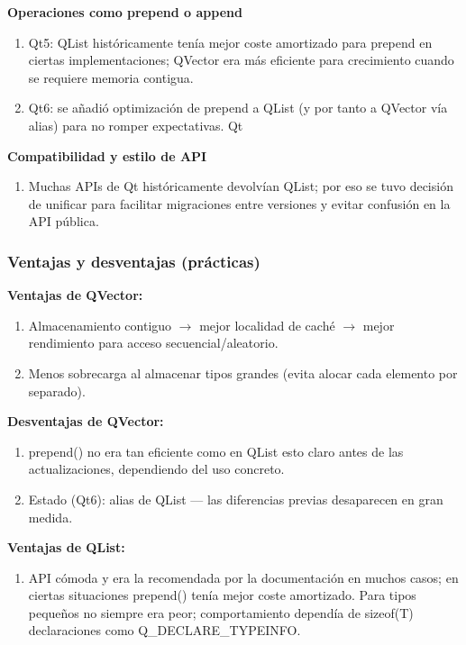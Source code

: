 \textbf{Operaciones como prepend o append}

\begin{enumerate}
    \item Qt5: QList históricamente tenía mejor coste amortizado para prepend en ciertas implementaciones; QVector era más eficiente para crecimiento cuando se requiere memoria contigua. 
    \item Qt6: se añadió optimización de prepend a QList (y por tanto a QVector vía alias) para no romper expectativas. Qt
\end{enumerate}

\textbf{Compatibilidad y estilo de API}

\begin{enumerate}
    \item Muchas APIs de Qt históricamente devolvían QList; por eso se tuvo decisión de unificar para facilitar migraciones entre versiones y evitar confusión en la API pública.
\end{enumerate}



\subsubsection{Ventajas y desventajas (prácticas)}

\textbf{Ventajas de QVector:}

\begin{enumerate}
    \item Almacenamiento contiguo \(\to \) mejor localidad de caché \(\to \) mejor rendimiento para acceso secuencial/aleatorio. 
    \item Menos sobrecarga al almacenar tipos grandes (evita alocar cada elemento por separado).
\end{enumerate}

\textbf{Desventajas de QVector:}

\begin{enumerate}
    \item prepend() no era tan eficiente como en QList esto claro antes de las actualizaciones, dependiendo del uso concreto. 
    \item Estado (Qt6): alias de QList --- las diferencias previas desaparecen en gran medida.
\end{enumerate}

\textbf{Ventajas de QList:}

\begin{enumerate}
    \item API cómoda y era la recomendada por la documentación en muchos casos; en ciertas situaciones prepend() tenía mejor coste amortizado. Para tipos pequeños no siempre era peor; comportamiento dependía de sizeof(T) declaraciones como Q\_DECLARE\_TYPEINFO.
\end{enumerate}

